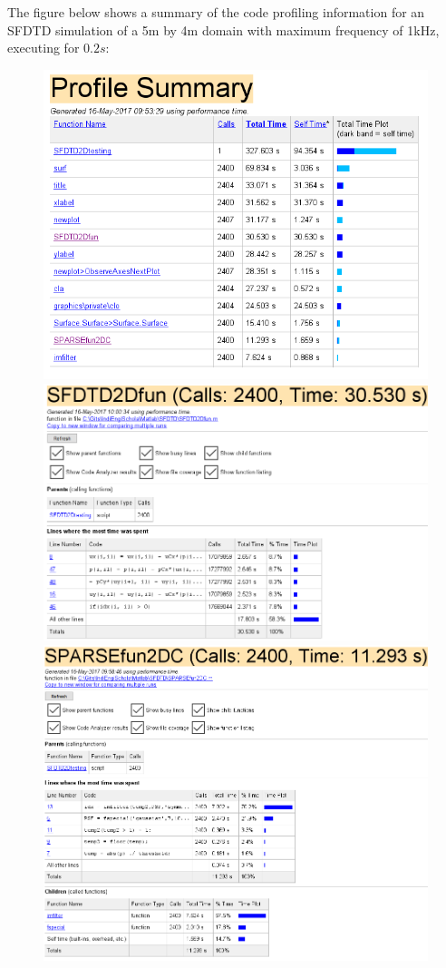 The figure below shows a summary of the code profiling information for an SFDTD simulation of a 5m by 4m domain with maximum frequency of 1kHz, executing for $0.2s$:\\
\begin{figure}[H]
\centering
  \includegraphics[width=1\textwidth]{./graphics/sfdtdprosum.png}
  \includegraphics[width=1\textwidth]{./graphics/sfdtdfunprosum.png}
  \includegraphics[width=1\textwidth]{./graphics/sparfunprosum.png}

\end{figure}
